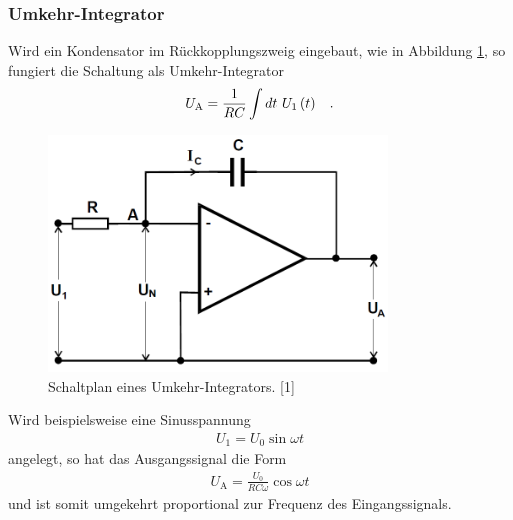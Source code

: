 \documentclass[]{scrartcl}
\begin{document}
\subsubsection{Umkehr-Integrator}
Wird ein Kondensator im Rückkopplungszweig eingebaut, wie in Abbildung \ref{fig:schalplan_umkehrintegrator}, so fungiert die Schaltung als Umkehr-Integrator
\begin{align}
U_\text{A}= \frac{1}{RC}\int dt\ U_1\left(t\right)  \hspace{0.3cm}\text{.}
\end{align}
\begin{figure}[H]
\centering
\includegraphics[width=9cm]{images/schalplan_umkehrintegrator.png}
\caption{Schaltplan eines Umkehr-Integrators. [1]}
\label{fig:schalplan_umkehrintegrator}
\end{figure}
Wird beispielsweise eine Sinusspannung 
\begin{align}
U_1=U_0 \sin \omega t
\end{align}
angelegt, so hat das Ausgangssignal die Form
\begin{align}
U_\text{A} = \frac{U_0}{RC\omega}\cos \omega t
\end{align}
und ist somit umgekehrt proportional zur Frequenz des Eingangssignals.
\end{document}
